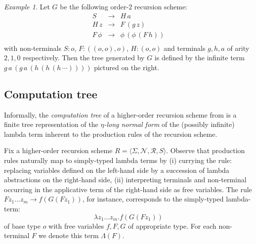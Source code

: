 \documentclass[a4paper]{article}[12pt]
\theoremstyle{remark}
\newtheorem{example}{Example}[section]
\theoremstyle{definition}
\begin{document}
\begin{example}\label{eg:running}
	Let $G$ be the following order-2 recursion scheme:
	\[\begin{array}{rll}
	S & \rightarrow & H \, a\\
	H \, z & \rightarrow & F \, (g \,
	z)\\
	F \, \phi & \rightarrow & \phi \, (\phi \, (F \, h))\\
	\end{array}\]
	with non-terminals $S:o$, $F : ((o, o),o)$, $H:(o,o)$ and terminals $g, h, a$ of arity $2, 1, 0$ respectively.
	Then the tree generated by $G$ is defined by the infinite term
	$g \, a \, (g \, a \, (h \, (h \, (h \,
	\cdots))))$ pictured on the right.%
	
\end{example}

\subsection{Computation tree}

Informally, the \emph{computation tree} of a higher-order recursion scheme from \cite{OngLics2006} is a finite tree representation of the \emph{$\eta$-long normal form} of the (possibly infinite) lambda term inherent to the production rules of the recursion scheme.

Fix a higher-order recursion scheme $R = \langle \Sigma, \mathcal{N}, \mathcal{R}, S \rangle$.
Observe that production rules naturally map to simply-typed lambda terms by (i) currying the rule: replacing variables defined on the left-hand side by a succession of lambda abstractions on the right-hand side, (ii) interpreting terminals and non-terminal occurring in the applicative term of the right-hand side as free variables. The rule $F z_1 \ldots z_m \rightarrow f (G (F z_1))$, for instance, corresponds to the simply-typed lambda-term:
$$\lambda z_1 \ldots z_m . f (G (F z_1))$$ of base type $o$ with free variables $f, F, G$ of appropriate type. For each non-terminal $F$ we denote this term $\Lambda(F)$.
\end{document}
